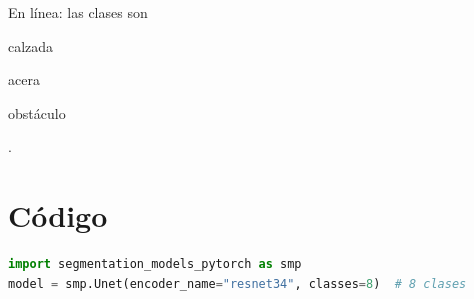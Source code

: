 \documentclass[IB]{TFUOC}
\begin{document}
En línea: las clases son \begin{enlinea}\item calzada \item acera \item obstáculo\end{enlinea}.

\section{Código}
\begin{lstlisting}[language=Python, caption={Definición del modelo.}]
import segmentation_models_pytorch as smp
model = smp.Unet(encoder_name="resnet34", classes=8)  # 8 clases
\end{lstlisting}

\printbibliography[heading=bibintoc]
\end{document}
